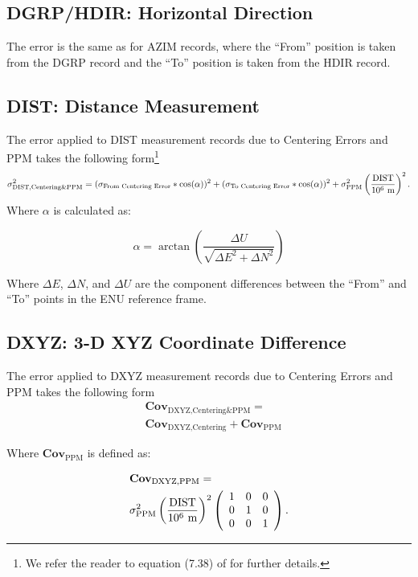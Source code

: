 \subsection{DGRP/HDIR: Horizontal Direction}
The error is the same as for AZIM records, where the ``From'' position is taken from the DGRP record and the ``To'' position is taken from the HDIR record.
\subsection{DIST: Distance Measurement}
The error applied to DIST measurement records due to Centering Errors and PPM takes the following form\footnote{We refer the reader to equation (7.38) of \cite{ghilani} for further details.}
\begin{equation}
\sigma_{\text{DIST,Centering\&PPM}}^2=(\sigma_{\text{From Centering Error}}*\cos(\alpha))^2+(\sigma_{\text{To Centering Error}}*\cos(\alpha))^2+\sigma_{\text{PPM}}^2\left(\frac{\text{DIST}}{10^6\text{ m}}\right)^2.
\end{equation}
Where $\alpha$ is calculated as:

\begin{equation}
    \alpha=\arctan(\frac{\Delta U}{\sqrt{\Delta E^2 + \Delta N^2}})
\end{equation}

Where $\Delta E$, $\Delta N$, and $\Delta U$ are the component differences between the ``From'' and ``To'' points in the ENU reference frame.

\subsection{DXYZ: 3-D XYZ Coordinate Difference}
The error applied to DXYZ measurement records due to Centering Errors and PPM takes the following form
\begin{eqnarray}
&\textbf{Cov}_{\text{DXYZ,Centering\&PPM}}=\\\nonumber
&\textbf{Cov}_{\text{DXYZ,Centering}} + \textbf{Cov}_{\text{PPM}}
\end{eqnarray}

Where $\textbf{Cov}_{\text{PPM}}$ is defined as:

\begin{eqnarray}
    &\textbf{Cov}_{\text{DXYZ,PPM}}=\\\nonumber
    &\sigma_{\text{PPM}}^2\left(\frac{\text{DIST}}{10^6\text{ m}}\right)^2\left(\begin{array}{ccc}1&0&0\\0&1&0\\0&0&1\end{array}\right).
\end{eqnarray}

